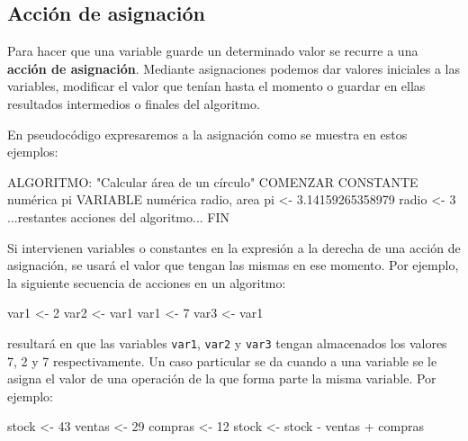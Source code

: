 \documentclass[
]{book}
\newenvironment{Shaded}{\begin{snugshade}}{\end{snugshade}}
\newcommand{\NormalTok}[1]{#1}
\begin{document}
\hypertarget{acciuxf3n-de-asignaciuxf3n}{%
\subsection{Acción de asignación}\label{acciuxf3n-de-asignaciuxf3n}}

Para hacer que una variable guarde un determinado valor se recurre a una \textbf{acción de asignación}. Mediante asignaciones podemos dar valores iniciales a las variables, modificar el valor que tenían hasta el momento o guardar en ellas resultados intermedios o finales del algoritmo.

En pseudocódigo expresaremos a la asignación como se muestra en estos ejemplos:

\begin{Shaded}
\begin{Highlighting}[]
\NormalTok{ALGORITMO: "Calcular área de un círculo"}
\NormalTok{COMENZAR}
\NormalTok{    CONSTANTE numérica pi}
\NormalTok{    VARIABLE numérica radio, area}
\NormalTok{    pi \textless{}{-} 3.14159265358979}
\NormalTok{    radio \textless{}{-} 3}
\NormalTok{    ...restantes acciones del algoritmo...}
\NormalTok{FIN}
\end{Highlighting}
\end{Shaded}

Si intervienen variables o constantes en la expresión a la derecha de una acción de asignación, se usará el valor que tengan las mismas en ese momento. Por ejemplo, la siguiente secuencia de acciones en un algoritmo:

\begin{Shaded}
\begin{Highlighting}[]
\NormalTok{var1 \textless{}{-} 2}
\NormalTok{var2 \textless{}{-} var1}
\NormalTok{var1 \textless{}{-} 7}
\NormalTok{var3 \textless{}{-} var1}
\end{Highlighting}
\end{Shaded}

resultará en que las variables \texttt{var1}, \texttt{var2} y \texttt{var3} tengan almacenados los valores 7, 2 y 7 respectivamente. Un caso particular se da cuando a una variable se le asigna el valor de una operación de la que forma parte la misma variable. Por ejemplo:

\begin{Shaded}
\begin{Highlighting}[]
\NormalTok{stock \textless{}{-} 43}
\NormalTok{ventas \textless{}{-} 29}
\NormalTok{compras \textless{}{-} 12}
\NormalTok{stock \textless{}{-} stock {-} ventas + compras}
\end{Highlighting}
\end{Shaded}
\end{document}
